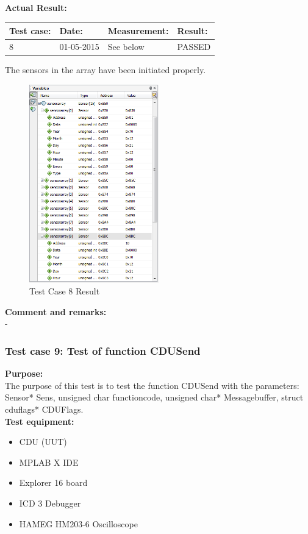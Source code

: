 \textbf{Actual Result:}\\
\begin{table}[H]
\centering
\begin{tabular}{|p{2cm}|p{2cm}|p{3cm}|p{2cm}|}\hline
\textbf{Test case:} & \textbf{Date:} & \textbf{Measurement:} & \textbf{Result:} \\ \hline
8 & 01-05-2015 & See below & PASSED \\ \hline
\end{tabular}
\end{table}
The sensors in the array have been initiated properly.\\
\begin{figure}[H]
\centering
\includegraphics[width=0.5\textwidth]{billeder/CDUtestcase8}
\caption{Test Case 8 Result}
\label{fig:cdutestcase8}
\end{figure}

\textbf{Comment and remarks:}\\
-\\

\subsubsection{Test case 9: Test of function CDUSend }
\textbf{Purpose:}\\
The purpose of this test is to test the function CDUSend with the parameters: Sensor* Sens, unsigned char functioncode, unsigned char* Messagebuffer, struct cduflags* CDUFlags.\\

\textbf{Test equipment:}
\begin{itemize}
\item CDU (UUT)
\item MPLAB X IDE
\item Explorer 16 board
\item ICD 3 Debugger
\item HAMEG HM203-6 Oscilloscope
\end{itemize}

